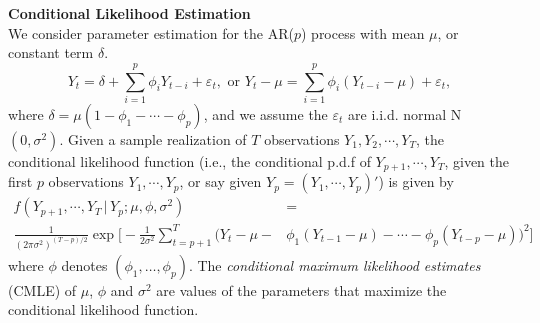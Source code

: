 \noindent\textbf{Conditional Likelihood Estimation} \\


We consider parameter estimation for the AR($p$) process with mean $\mu$, or constant term $\delta$.
	\begin{equation}\label{eqn:ytseqagain}
	Y_t = \delta + \sum_{i=1}^p\phi_iY_{t-i} + \varepsilon_t, \text{ or }Y_t - \mu = \sum_{i=1}^p\phi_i(Y_{t-i} - \mu) + \varepsilon_t,
	\end{equation}
where $\delta = \mu(1 - \phi_1 - \cdots - \phi_p)$, and we assume the $\varepsilon_t$ are i.i.d. normal N$(0,\sigma^2)$. Given a sample realization of $T$ observations $Y_1,Y_2,\cdots,Y_T$, the conditional likelihood function (i.e., the conditional p.d.f of $Y_{p+1},\cdots,Y_T$, given the first $p$ observations $Y_1,\cdots,Y_p$, or say given $Y_p = (Y_1,\cdots,Y_p)'$) is given by
	\[
	\begin{split}
	f(Y_{p+1},\cdots,Y_T \,|\, Y_p;\mu,\phi,\sigma^2)&=\\ 
	\frac{1}{(2\pi\sigma^2)^{(T-p)/2}} \exp\bigg[-\frac{1}{2\sigma^2}\sum_{t=p+1}^T \big(Y_t - \mu - &\phi_1(Y_{t-1} - \mu) - \cdots  - \phi_p(Y_{t-p} - \mu) \big)^2 \bigg] 
	\end{split}
	\]
where $\phi$ denotes $(\phi_1,\ldots,\phi_p)$. The \textit{conditional maximum likelihood estimates} (CMLE) of $\mu$, $\phi$ and $\sigma^2$ are values of the parameters that maximize the conditional likelihood function.


